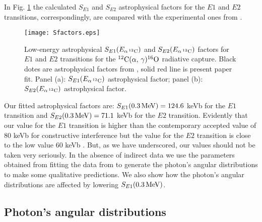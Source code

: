 \documentclass[prl,unsortedaddress,groupedaddress,twocolumn,amsmath,amsfonts,amssymb,showpacs,floatfix,nofootinbib]{revtex4}
\begin{document}
In Fig. \ref{fig_Sfactors} the calculated $S_{E1}$ and $S_{E2}$ astrophysical factors for the $E1$ and $E2$ transitions, correspondingly, are compared with the experimental ones from \cite{redder}. 
\begin{figure}
[tbp] 
  \texttt{[image: Sfactors.eps]}
  \caption{Low-energy astrophysical $S_{E1}(E_{\alpha\,{}^{12}{\rm C}})$ and $S_{E2}(E_{\alpha\,{}^{12}{\rm C}})$ factors for $E1$ and $E2$ transitions for the  ${}^{12}{\rm C}(\alpha,\,\gamma){}^{16}{\rm O}$ radiative capture. Black dotes are astrophysical factors from \cite{redder}, solid red line is present paper fit.
Panel (a): $S_{E1}(E_{\alpha\,{}^{12}{\rm C}})$ astrophysical factor; panel (b): $S_{E2}(E_{\alpha\,{}^{12}{\rm C}})$ astrophysical factor.}  
\label{fig_Sfactors}
\end{figure} 
Our fitted astrophysical factors are: $S_{E1}(0.3\,{\rm MeV})= 124.6$ keVb for the $E1$ transition and $S_{E2}(0.3\,{\rm MeV})= 71.1$ keVb for the $E2$ transition. Evidently that our 
value for the $E1$ transition is higher than the contemporary accepted value of $80$ keVb for constructive interference but the value for the $E2$ transition is close to the low value $60$ keVb \cite{gai2015}. But, as we have underscored, our values should not be taken very seriously.
In the absence of indirect data we use the parameters obtained from fitting the data from \cite{redder} to generate the photon's angular distributions to make some qualitative predictions.
We also show how the photon's angular distributions are affected by lowering $S_{E1}(0.3\,{\rm MeV})$.
 
\subsection{Photon's angular distributions}
\end{document}
